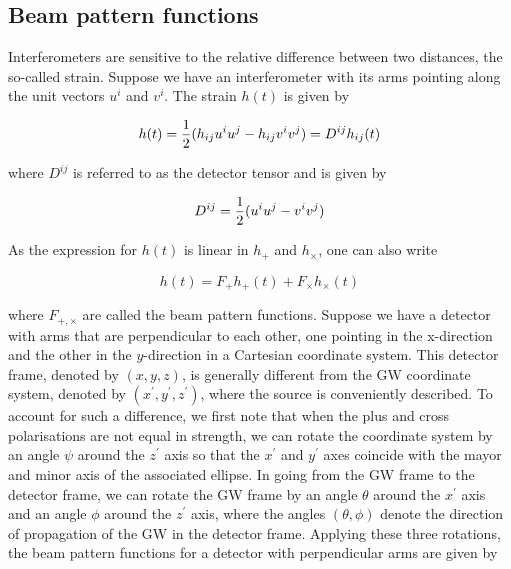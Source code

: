 \documentclass[binding=0.6cm, LaM]{sapthesis}
\begin{document}
\subsection{Beam pattern functions}

        Interferometers are sensitive to the relative difference between two distances, the so-called strain.
        Suppose we have an interferometer with its arms pointing along the unit vectors $u^i$ and $v^i$. The strain $h(t)$ is given by

                \begin{equation}
                h(t) = {1 \over 2} (h_{ij}u^iu^j - h_{ij}v^iv^j) = D^{ij}h_{ij}(t)
                \end{equation}

        where $D^{ij}$ is referred to as the detector tensor and is given by

                \begin{equation}
                D^{ij} = {1\over 2} (u^iu^j -v^iv^j)
                \end{equation}

        As the expression for $h(t)$ is linear in $h_{+}$ and $h_{\times}$, one can also write

                \begin{equation}
                h(t) = F_{+}h_{+} (t) + F_{\times}h_{\times}(t)
                \end{equation}

        where $F_{+,\times}$ are called the beam pattern functions. Suppose we have a detector
        with arms that are perpendicular to each other, one pointing in the x-direction and the other
        in the $y$-direction in a Cartesian coordinate system. This detector frame, denoted by $(x,y,z)$,
        is generally different from the GW coordinate system, denoted by $(x^\prime,y^\prime,z^\prime)$, where the source
        is conveniently described. To account for such a difference, we first note that when the plus
        and cross polarisations are not equal in strength, we can rotate the coordinate system by
        an angle $\psi$ around the $z^\prime$ axis so that the $x^\prime$ and $y^\prime$ axes
        coincide with the mayor and minor axis of the associated ellipse.
        In going from the GW frame to the detector frame, we can rotate the GW frame by
        an angle $\theta$ around the $x^\prime$ axis and an angle $\phi$ around the $z^\prime$ axis,
        where the angles $(\theta, \phi)$ denote the direction of propagation of the GW in the detector frame.
        Applying these three rotations, the beam pattern functions for a detector with perpendicular arms are given by
\end{document}
